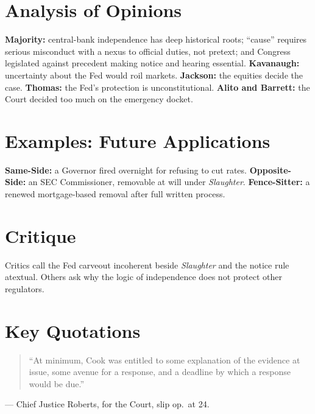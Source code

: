 \documentclass[12pt]{article}
\begin{document}
\section{Analysis of Opinions}
\textbf{Majority:} central-bank independence has deep historical roots; ``cause'' requires serious misconduct with a nexus to official duties, not pretext; and Congress legislated against precedent making notice and hearing essential. \textbf{Kavanaugh:} uncertainty about the Fed would roil markets. \textbf{Jackson:} the equities decide the case. \textbf{Thomas:} the Fed's protection is unconstitutional. \textbf{Alito and Barrett:} the Court decided too much on the emergency docket.

\section{Examples: Future Applications}
\textbf{Same-Side:} a Governor fired overnight for refusing to cut rates. \textbf{Opposite-Side:} an SEC Commissioner, removable at will under \textit{Slaughter}. \textbf{Fence-Sitter:} a renewed mortgage-based removal after full written process.

\section{Critique}
Critics call the Fed carveout incoherent beside \textit{Slaughter} and the notice rule atextual. Others ask why the logic of independence does not protect other regulators.

\section{Key Quotations}
\begin{quote}
``At minimum, Cook was entitled to some explanation of the evidence at issue, some avenue for a response, and a deadline by which a response would be due.''
\end{quote}
\noindent --- Chief Justice Roberts, for the Court, slip op.\ at 24.
\end{document}
